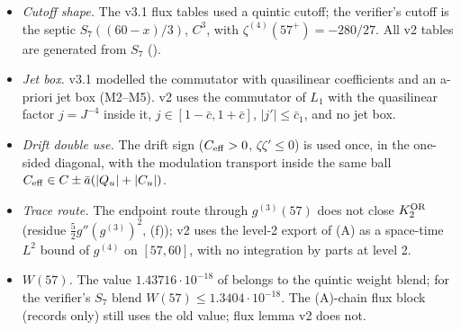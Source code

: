 \begin{itemize}
\item[(E-F1)] \emph{Cutoff shape.} The v3.1 flux tables used a quintic cutoff; the verifier's cutoff is the septic $S_7((60-x)/3)$, $C^3$, with $\zeta^{(4)}(57^+)=-280/27$. All v2 tables are generated from $S_7$ ().
\item[(E-F2)] \emph{Jet box.} v3.1 modelled the commutator with quasilinear coefficients and an a-priori jet box (M2--M5). v2 uses the commutator of $L_1$ with the quasilinear factor $j=J^{-4}$ inside it, $j\in[1-\bar c,1+\bar c]$, $|j'|\le\bar c_1$, and no jet box.
\item[(E-F3)] \emph{Drift double use.} The drift sign ($C_{\rm eff}>0$, $\zeta\zeta'\le0$) is used once, in the one-sided diagonal, with the modulation transport inside the same ball $C_{\rm eff}\in C\pm\bar a(|Q_u|+|C_u|)$.
\item[(E-F4)] \emph{Trace route.} The endpoint route through $g^{(3)}(57)$ does not close $K_2^{\rm OR}$ (residue $\frac52 g''(g^{(3)})^2$,  (f)); v2 uses the level-2 export of (A) as a space-time $L^2$ bound of $g^{(4)}$ on $[57,60]$, with no integration by parts at level 2.
\item[(E-F5)] \emph{$W(57)$.} The value $1.43716\cdot10^{-18}$ of  belongs to the quintic weight blend; for the verifier's $S_7$ blend $W(57)\le1.3404\cdot10^{-18}$. The (A)-chain flux block (records only) still uses the old value; flux lemma v2 does not.
\end{itemize}

